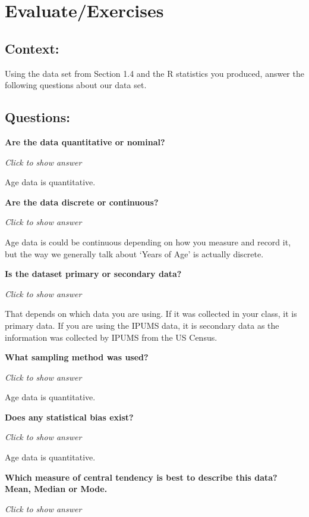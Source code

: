 \documentclass[
]{book}
\begin{document}
\hypertarget{evaluateexercises}{%
\section{Evaluate/Exercises}\label{evaluateexercises}}

\hypertarget{context}{%
\subsection{Context:}\label{context}}

Using the data set from Section 1.4 and the R statistics you produced,
answer the following questions about our data set.

\hypertarget{questions}{%
\subsection{Questions:}\label{questions}}

\textbf{Are the data quantitative or nominal?}

\emph{Click to show answer}

Age data is quantitative.

\textbf{Are the data discrete or continuous?}

\emph{Click to show answer}

Age data is could be continuous depending on how you measure and record it,
but the way we generally talk about `Years of Age' is actually discrete.

\textbf{Is the dataset primary or secondary data?}

\emph{Click to show answer}

That depends on which data you are using. If it was collected in your class, it is primary data. If you are using the IPUMS data, it is secondary data as the information was collected by IPUMS from the US Census.

\textbf{What sampling method was used?}

\emph{Click to show answer}

Age data is quantitative.

\textbf{Does any statistical bias exist?}

\emph{Click to show answer}

Age data is quantitative.

\textbf{Which measure of central tendency is best to describe this data? Mean, Median or Mode.}

\emph{Click to show answer}
\end{document}
